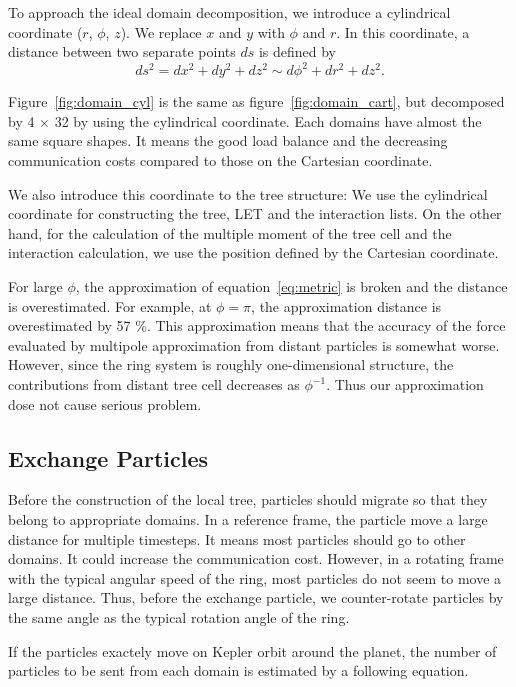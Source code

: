 \documentclass[oribibl]{llncs}
\begin{document}
To approach the ideal domain decomposition, we introduce a cylindrical
coordinate ($r$, $\phi$, $z$). We replace $x$ and $y$ with $\phi$ and
$r$. In this coordinate, a distance between two separate points $ds$
is defined by
\begin{equation}
  \label{eq:metric}
  ds^2 = dx^2 + dy^2 + dz^2 \sim d\phi ^2 + dr^2 + dz^2.
\end{equation}

Figure~\ref{fig:domain_cyl} is the same as
figure~\ref{fig:domain_cart}, but decomposed by 4 $\times$ 32 by using
the cylindrical coordinate. Each domains have almost the same square
shapes. It means the good load balance and the decreasing
communication costs compared to those on the Cartesian coordinate.

We also introduce this coordinate to the tree structure: We use the
cylindrical coordinate for constructing the tree, LET and the
interaction lists. On the other hand, for the calculation of the
multiple moment of the tree cell and the interaction calculation, we
use the position defined by the Cartesian coordinate.

For large $\phi$, the approximation of equation~\ref{eq:metric} is
broken and the distance is overestimated. For example, at $\phi=\pi$,
the approximation distance is overestimated by 57 \%. This
approximation means that the accuracy of the force evaluated by
multipole approximation from distant particles is somewhat
worse. However, since the ring system is roughly one-dimensional
structure, the contributions from distant tree cell decreases as
$\phi^{-1}$. Thus our approximation dose not cause serious problem.

\subsection{Exchange Particles}
\label{subsec:exptcl}

Before the construction of the local tree, particles should migrate so
that they belong to appropriate domains. In a reference frame, the
particle move a large distance for multiple timesteps. It means most
particles should go to other domains. It could increase the
communication cost. However, in a rotating frame with the typical
angular speed of the ring, most particles do not seem to move a large
distance. Thus, before the exchange particle, we counter-rotate
particles by the same angle as the typical rotation angle of the ring.

If the particles exactely move on Kepler orbit around the planet, the
number of particles to be sent from each domain is estimated by a
following equation.
\end{document}
